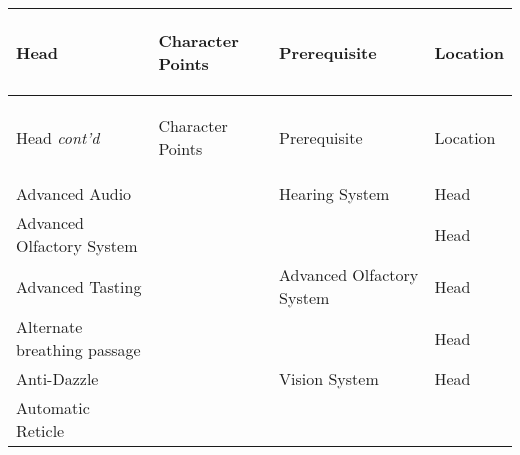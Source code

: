 \documentclass[twoside]{book}
\begin{document}
\begin{longtable}{p{1.25in}p{2em}ll} 
  Head
  &
  \begin{turn}{70}{Character Points}\end{turn}
          
  &
  \begin{turn}{70}{Prerequisite}\end{turn}
          
  &
  \begin{turn}{70}{Location}\end{turn}
          
  \\
  \hline
  \hline
  \endfirsthead
  Head \textit{cont'd}
        
  &
  \begin{turn}{70}{Character Points}\end{turn}
          
  &
  \begin{turn}{70}{Prerequisite}\end{turn}
          
  &
  \begin{turn}{70}{Location}\end{turn}
          
  \\
  \hline
  \endhead
      
  \raggedright
           Advanced Audio 
  &
  
  &
   Hearing System 
  &
   Head 
  \tabularnewline
      
  \raggedright
           Advanced Olfactory System
           
  &
  
  &
  
  &
   Head 
  \tabularnewline
      
  \raggedright
           Advanced Tasting 
  &
  
  &
   Advanced Olfactory
           System 
  &
   Head 
  \tabularnewline
      
  \raggedright
           Alternate breathing passage
           
  &
  
  &
  
  &
   Head 
  \tabularnewline
      
  \raggedright
           Anti-Dazzle 
  &
  
  &
   Vision System 
  &
   Head 
  \tabularnewline
      
  \raggedright
           Automatic Reticle 
  &
  

\end{longtable}
\end{document}
